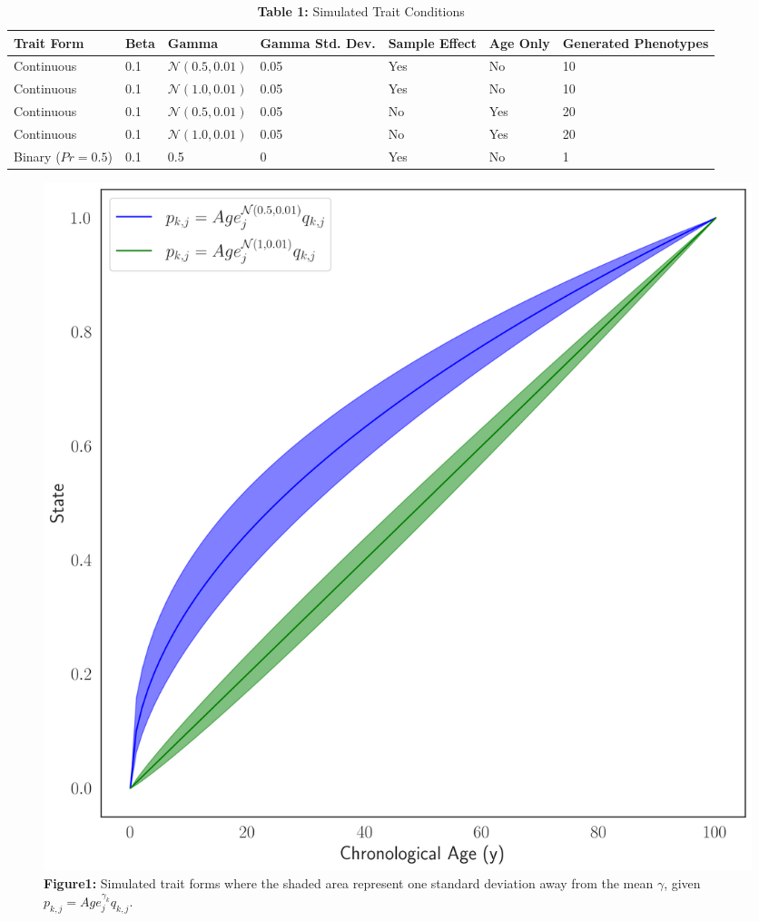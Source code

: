 \documentclass{article}
\begin{document}
{\begin{linenumbers}
\end{linenumbers}
\printbibliography



\begin{table}[H]
\caption*{\textbf{Table 1:} Simulated Trait Conditions}  
\begin{tabular}{| p{20mm} | p{15mm} | p{20mm} | p{20mm} | p{20mm} | p{20mm} | p{20mm} |}
\hline
\textbf{Trait Form}&\textbf{Beta}&\textbf{Gamma}&\textbf{Gamma Std. Dev.}&\textbf{Sample Effect}&
\textbf{Age Only}&\textbf{Generated Phenotypes}\\ \hline
Continuous&0.1&$\mathcal{N}(0.5, 0.01)$&0.05&Yes&No&10\\ \hline
Continuous&0.1&$\mathcal{N}(1.0, 0.01)$&0.05&Yes&No&10\\ \hline
Continuous&0.1&$\mathcal{N}(0.5, 0.01)$&0.05&No&Yes&20\\ \hline
Continuous&0.1&$\mathcal{N}(1.0, 0.01)$&0.05&No&Yes&20\\ \hline
Binary ($Pr=0.5$)&0.1&0.5&0&Yes&No&1\\ \hline
\end{tabular}
\end{table}

\begin{center}
    \begin{figure}
    \includegraphics[scale=.4]{Figures/Figure1.png}    
    \footnotesize
    \caption*{\small \textbf{Figure1:} Simulated trait forms where the shaded area represent one 
    standard deviation away from the mean $\gamma$, given $p_{k,j} = Age_j^{\gamma_{k}} q_{k,j}$.}
    \end{figure}
\end{center}

}
\end{document}
